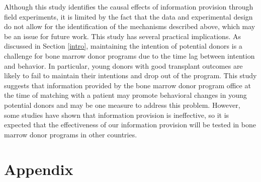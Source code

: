\documentclass[
  11pt,
  a4paper
]{article}
\begin{document}
Although this study identifies the causal effects of information provision through field experiments, it is limited by the fact that the data and experimental design do not allow for the identification of the mechanisms described above, which may be an issue for future work. This study has several practical implications. As discussed in Section \ref{intro}, maintaining the intention of potential donors is a challenge for bone marrow donor programs due to the time lag between intention and behavior. In particular, young donors with good transplant outcomes are likely to fail to maintain their intentions and drop out of the program. This study suggests that information provided by the bone marrow donor program office at the time of matching with a patient may promote behavioral changes in young potential donors and may be one measure to address this problem. However, some studies \citep[for example,][]{Switzer2018} have shown that information provision is ineffective, so it is expected that the effectiveness of our information provision will be tested in bone marrow donor programs in other countries.

\clearpage

\hypertarget{appendix}{%
\section*{Appendix}\label{appendix}}
\end{document}
